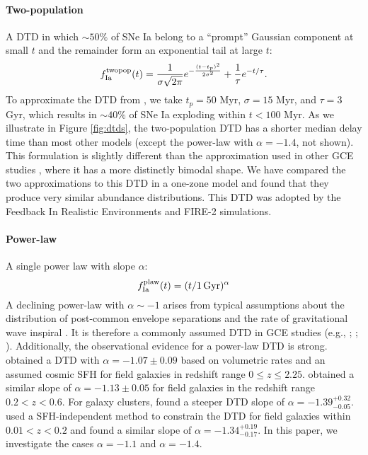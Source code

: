 \documentclass[twocolumn,twocolappendix,linenumbers]{aastex631}
\begin{document}
\paragraph{Two-population} A DTD in which $\sim50\%$ of SNe Ia belong to a ``prompt'' Gaussian component at small $t$ and the remainder form an exponential tail at large $t$:
\begin{equation}
    f_{\rm Ia}^{\rm twopop}(t) = \frac{1}{\sigma\sqrt{2\pi}} e^{-\frac{(t-t_p)^2}{2\sigma^2}} + \frac{1}{\tau} e^{-t/\tau}.
    \label{eq:prompt-dtd}
\end{equation}
To approximate the DTD from \citet{Mannucci2006-TwoPopulations}, we take $t_p=50$ Myr, $\sigma=15$ Myr, and $\tau=3$ Gyr, which results in $\sim 40\%$ of SNe Ia exploding within $t<100$ Myr. As we illustrate in Figure \ref{fig:dtds}, the two-population DTD has a shorter median delay time than most other models (except the power-law with $\alpha=-1.4$, not shown). This formulation is slightly different than the approximation used in other GCE studies \citep[e.g.,][]{Matteucci2006-BimodalDTDConsequences,Poulhazan2018-PrecisionPollution}, where it has a more distinctly bimodal shape. We have compared the two approximations to this DTD in a one-zone model and found that they produce very similar abundance distributions. This DTD was adopted by the Feedback In Realistic Environments \citep[FIRE;][]{Hopkins2014-FIRE-1} and FIRE-2 \citep{Hopkins2018-FIRE-2} simulations.

\paragraph{Power-law} A single power law with slope $\alpha$:
\begin{equation}
    f_{\rm Ia}^{\rm plaw}(t) = (t/1\,\rm{Gyr})^\alpha
    \label{eq:powerlaw-dtd}
\end{equation}
A declining power-law with $\alpha\sim-1$ {\bf \citep{Totani2008-DTD}} arises from typical assumptions about the distribution of post-common envelope separations and the rate of gravitational wave inspiral \citep[see Section 3.5 from][]{Maoz2014-Review}. It is therefore a commonly assumed DTD in GCE studies (e.g., \citealt{Rybizki2017-Chempy}; ; \citealt{Weinberg2023-CCSNYield}). Additionally, the observational evidence for a power-law DTD is strong. \citet{Maoz2017-CosmicDTD} obtained a DTD with $\alpha=-1.07\pm0.09$ based on volumetric rates and an assumed cosmic SFH for field galaxies in redshift range $0\leq z\leq 2.25$. \citet{Wiseman2021-DESRates} obtained a similar slope of $\alpha=-1.13\pm0.05$ for field galaxies in the redshift range $0.2<z<0.6$. For galaxy clusters, \citet{Maoz2017-CosmicDTD} found a steeper DTD slope of $\alpha=-1.39^{+0.32}_{-0.05}$. \citet{Heringer2019-FieldGalaxyDTD} used a SFH-independent method to constrain the DTD for field galaxies within $0.01<z<0.2$ and found a similar slope of $\alpha=-1.34^{+0.19}_{-0.17}$.
In this paper, we investigate the cases $\alpha=-1.1$ and $\alpha=-1.4$.
\end{document}
